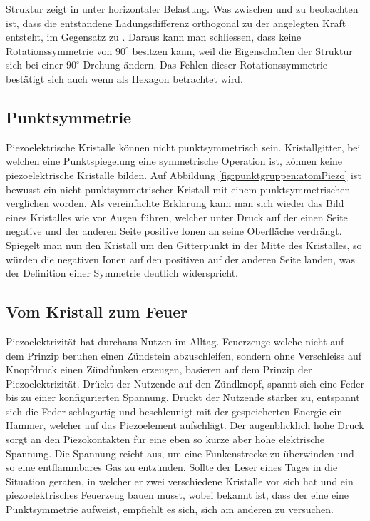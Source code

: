 Struktur  zeigt  in unter horizontaler Belastung.
Was zwischen  und  zu beobachten ist, dass die entstandene Ladungsdifferenz orthogonal zu der angelegten Kraft entsteht, im Gegensatz zu .
Daraus kann man schliessen, dass  keine Rotationssymmetrie von \(90^\circ\) besitzen kann, weil die Eigenschaften der Struktur sich bei einer \(90^\circ\) Drehung ändern.
Das Fehlen dieser Rotationssymmetrie bestätigt sich auch wenn  als Hexagon betrachtet wird.
 

\subsection{Punktsymmetrie}

Piezoelektrische Kristalle können nicht punktsymmetrisch sein.
Kristallgitter, bei welchen eine Punktspiegelung eine symmetrische Operation ist, können keine piezoelektrische Kristalle bilden.
Auf Abbildung \ref{fig:punktgruppen:atomPiezo} ist bewusst  ein nicht punktsymmetrischer Kristall mit einem punktsymmetrischen  verglichen worden.
Als vereinfachte Erklärung kann man sich wieder das Bild eines Kristalles wie  vor Augen führen, welcher unter Druck auf der einen Seite negative und der anderen Seite positive Ionen an seine Oberfläche verdrängt.
Spiegelt man nun den Kristall um den Gitterpunkt in der Mitte des Kristalles, so würden die negativen Ionen auf den positiven auf der anderen Seite landen, was der Definition einer Symmetrie deutlich widerspricht.


\subsection{Vom Kristall zum Feuer}

Piezoelektrizität hat durchaus Nutzen im Alltag.
Feuerzeuge welche nicht auf dem Prinzip beruhen einen Zündstein abzuschleifen, sondern ohne Verschleiss auf Knopfdruck einen Zündfunken erzeugen, basieren auf dem Prinzip der Piezoelektrizität.
Drückt der Nutzende auf den Zündknopf, spannt sich eine Feder bis zu einer konfigurierten Spannung.
Drückt der Nutzende stärker zu, entspannt sich die Feder schlagartig und beschleunigt mit der gespeicherten Energie ein Hammer, welcher auf das Piezoelement aufschlägt.
Der augenblicklich hohe Druck sorgt an den Piezokontakten für eine eben so kurze aber hohe elektrische Spannung.
Die Spannung reicht aus, um eine Funkenstrecke zu überwinden und so eine entflammbares Gas zu entzünden.
Sollte der Leser eines Tages in die Situation geraten, in welcher er zwei verschiedene Kristalle vor sich hat und ein piezoelektrisches Feuerzeug bauen musst, wobei bekannt ist, dass der eine eine Punktsymmetrie aufweist, empfiehlt es sich, sich am anderen zu versuchen.

